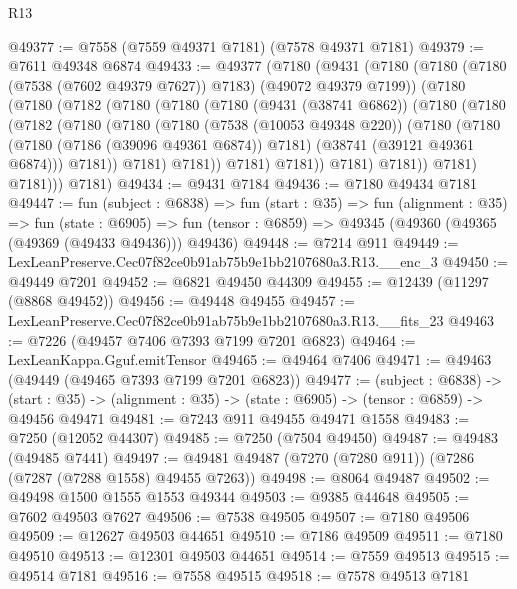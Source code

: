 \begin{lexlean}{R13}
\begin{coremodule}
@49377 := @7558 (@7559 @49371 @7181) (@7578 @49371 @7181)
@49379 := @7611 @49348 @6874
@49433 := @49377
    (@7180
      (@9431
        (@7180
          (@7180 (@7180 (@7538 (@7602 @49379 @7627)) @7183) (@49072 @49379 @7199))
          (@7180
            (@7180
              (@7182
                (@7180
                  (@7180
                    (@7180
                      (@9431 (@38741 @6862))
                      (@7180
                        (@7180
                          (@7182
                            (@7180
                              (@7180
                                (@7180
                                  (@7538 (@10053 @49348 @220))
                                  (@7180
                                    (@7180
                                      (@7180 (@7186 (@39096 @49361 @6874)) @7181)
                                      (@38741 (@39121 @49361 @6874)))
                                    @7181))
                                @7181)
                              @7181))
                          @7181)
                        @7181))
                    @7181)
                  @7181))
              @7181)
            @7181)))
      @7181)
@49434 := @9431 @7184
@49436 := @7180 @49434 @7181
@49447 := fun (subject : @6838) =>
  fun (start : @35) =>
  fun (alignment : @35) =>
  fun (state : @6905) =>
  fun (tensor : @6859) => @49345 (@49360 (@49365 (@49369 (@49433 @49436))) @49436)
@49448 := @7214 @911
@49449 := LexLeanPreserve.Cec07f82ce0b91ab75b9e1bb2107680a3.R13.__enc_3
@49450 := @49449 @7201
@49452 := @6821 @49450 @44309
@49455 := @12439 (@11297 (@8868 @49452))
@49456 := @49448 @49455
@49457 := LexLeanPreserve.Cec07f82ce0b91ab75b9e1bb2107680a3.R13.__fits_23
@49463 := @7226 (@49457 @7406 @7393 @7199 @7201 @6823)
@49464 := LexLeanKappa.Gguf.emitTensor
@49465 := @49464 @7406
@49471 := @49463 (@49449 (@49465 @7393 @7199 @7201 @6823))
@49477 := (subject : @6838) ->
  (start : @35) -> (alignment : @35) -> (state : @6905) -> (tensor : @6859) -> @49456 @49471
@49481 := @7243 @911 @49455 @49471 @1558
@49483 := @7250 (@12052 @44307)
@49485 := @7250 (@7504 @49450)
@49487 := @49483 (@49485 @7441)
@49497 := @49481 @49487 (@7270 (@7280 @911)) (@7286 (@7287 (@7288 @1558) @49455 @7263))
@49498 := @8064 @49487
@49502 := @49498 @1500 @1555 @1553 @49344
@49503 := @9385 @44648
@49505 := @7602 @49503 @7627
@49506 := @7538 @49505
@49507 := @7180 @49506
@49509 := @12627 @49503 @44651
@49510 := @7186 @49509
@49511 := @7180 @49510
@49513 := @12301 @49503 @44651
@49514 := @7559 @49513
@49515 := @49514 @7181
@49516 := @7558 @49515
@49518 := @7578 @49513 @7181

\end{coremodule}
\end{lexlean}
